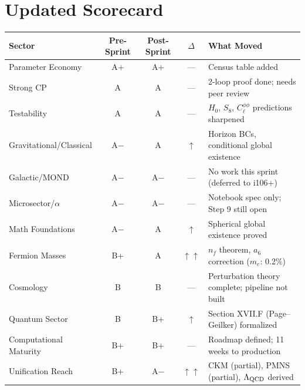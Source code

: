 \documentclass[11pt,a4paper]{article}
\begin{document}
\section{Updated Scorecard}

\begin{center}
\begin{longtable}{p{4cm}cccl}
\toprule
\textbf{Sector} & \textbf{Pre-Sprint} & \textbf{Post-Sprint} & \textbf{$\Delta$} & \textbf{What Moved} \\
\midrule
\endhead
Parameter Economy &
\textcolor{gradeAplus}{A+} & \textcolor{gradeAplus}{A+} & --- &
Census table added \\
\midrule
Strong CP &
\textcolor{gradeA}{A} & \textcolor{gradeA}{A} & --- &
2-loop proof done; needs peer review \\
\midrule
Testability &
\textcolor{gradeA}{A} & \textcolor{gradeA}{A} & --- &
$H_0$, $S_8$, $C_\ell^{\phi\phi}$ predictions sharpened \\
\midrule
Gravitational/Classical &
\textcolor{gradeAminus}{A$-$} & \textcolor{gradeA}{A} & $\uparrow$ &
Horizon BCs, conditional global existence \\
\midrule
Galactic/MOND &
\textcolor{gradeAminus}{A$-$} & \textcolor{gradeAminus}{A$-$} & --- &
No work this sprint (deferred to i106+) \\
\midrule
Microsector/$\alpha$ &
\textcolor{gradeAminus}{A$-$} & \textcolor{gradeAminus}{A$-$} & --- &
Notebook spec only; Step 9 still open \\
\midrule
Math Foundations &
\textcolor{gradeAminus}{A$-$} & \textcolor{gradeA}{A} & $\uparrow$ &
Spherical global existence proved \\
\midrule
Fermion Masses &
\textcolor{gradeBplus}{B+} & \textcolor{gradeA}{A} & $\uparrow\uparrow$ &
$n_f$ theorem, $a_6$ correction ($m_e$: 0.2\%) \\
\midrule
Cosmology &
\textcolor{gradeB}{B} & \textcolor{gradeB}{B} & --- &
Perturbation theory complete; pipeline not built \\
\midrule
Quantum Sector &
\textcolor{gradeB}{B} & \textcolor{gradeBplus}{B+} & $\uparrow$ &
Section XVII.F (Page--Geilker) formalized \\
\midrule
Computational Maturity &
\textcolor{gradeBplus}{B+} & \textcolor{gradeBplus}{B+} & --- &
Roadmap defined; 11 weeks to production \\
\midrule
Unification Reach &
\textcolor{gradeBplus}{B+} & \textcolor{gradeAminus}{A$-$} & $\uparrow\uparrow$ &
CKM (partial), PMNS (partial), $\Lambda_{\rm QCD}$ derived \\
\bottomrule
\end{longtable}
\end{center}
\end{document}
